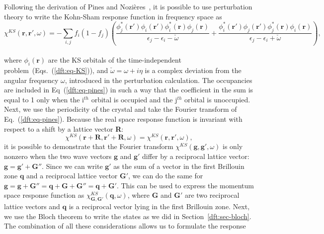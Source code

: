 \begin{refsection}
Following the derivation of Pines and Nozi\`eres~\cite{Nozieres1994}, it is 
possible to use perturbation theory to write the Kohn-Sham response function 
in frequency space as 
\begin{equation}\label{dft:eq-pines} 
\chi^{KS}(\mathbf{r},\mathbf{r}', \omega) = - \sum_{i,j} f_i \left(1 - f_j\right) \left( 
\frac{\phi_j^*(\mathbf{r'})\phi_i(\mathbf{r'})\phi_i^*(\mathbf{r})\phi_j(\mathbf{r})}{\epsilon_j 
- \epsilon_i - \check{\omega}} + 
\frac{\phi_i^*(\mathbf{r'})\phi_j(\mathbf{r'})\phi_j^*(\mathbf{r})\phi_i(\mathbf{r})}{\epsilon_j 
- \epsilon_i + \check{\omega}} \right), 
\end{equation} 
\\ 
where $\phi_i(\mathbf{r})$ are the KS orbitals of the time-independent 
problem~(Eqs.~(\ref{dft:eq-KS})), and $\check{\omega} = \omega + i \eta$ is a 
complex deviation from the angular frequency $\omega$, introduced in the 
perturbation calculation. The occupancies are included in Eq~(\ref{dft:eq-pines}) in 
such a way that the coefficient in the sum is equal to 1 only when the 
i$^{th}$ orbital is occupied and the j$^{th}$ orbital is unoccupied. Next, we 
use the periodicity of the crystal and take the Fourier transform of 
Eq.~(\ref{dft:eq-pines}). Because the real space response function is invariant 
with respect to a shift by a lattice vector \textbf{R}:  
\begin{equation} 
\chi^{KS}(\mathbf{r} + \mathbf{R},\mathbf{r}' + \mathbf{R}, \omega) = 
\chi^{KS}(\mathbf{r},\mathbf{r}', \omega), 
\end{equation} 
it is possible to demonstrate that the Fourier transform 
$\chi^{KS}(\mathbf{g},\mathbf{g}',\omega)$ is only nonzero when the two wave 
vectors $\mathbf{g}$ and $\mathbf{g}'$ differ by a reciprocal lattice vector: 
$\mathbf{g} = \mathbf{g}' + \mathbf{G}''$. Since we can write $\mathbf{g}'$ as 
the sum of a vector in the first Brillouin zone $\mathbf{q}$ and a reciprocal 
lattice vector $\mathbf{G}'$, we can do the same for $\mathbf{g} = \mathbf{g} 
+ \mathbf{G}'' = \mathbf{q} + \mathbf{G} + \mathbf{G}'' = \mathbf{q} + 
\mathbf{G}'$. This can be used to express the momentum space response function 
as $\chi_{\mathbf{G},\mathbf{G}'}^{KS}(\mathbf{q},\omega)$, where $\mathbf{G}$ 
and $\mathbf{G}'$ are two reciprocal lattice vectors and $\mathbf{q}$ is a 
reciprocal vector lying in the first Brillouin zone. Next, we use the Bloch 
theorem to write the states as we did in Section~\ref{dft:sec-bloch}. The 
combination of all these considerations allows us to formulate the response 

\end{refsection}

